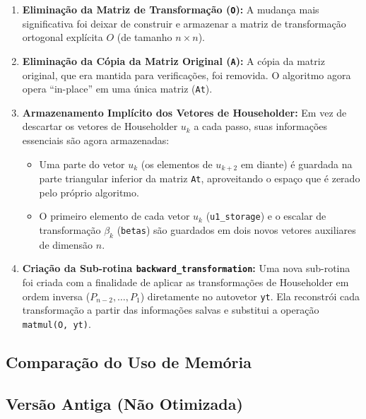 \documentclass[12pt, a4paper]{article} %
\begin{document}
        \begin{enumerate}
            \item \textbf{Elimina\c{c}\~ao da Matriz de Transforma\c{c}\~ao (\texttt{O}):} A mudan\c{c}a mais significativa foi deixar de construir e armazenar a matriz de transforma\c{c}\~ao ortogonal expl\'icita $O$ (de tamanho $n \times n$).

            \item \textbf{Elimina\c{c}\~ao da C\'opia da Matriz Original (\texttt{A}):} A c\'opia da matriz original, que era mantida para verifica\c{c}\~oes, foi removida. O algoritmo agora opera ``in-place'' em uma \'unica matriz (\texttt{At}).

            \item \textbf{Armazenamento Impl\'icito dos Vetores de Householder:} Em vez de descartar os vetores de Householder $u_k$ a cada passo, suas informa\c{c}\~oes essenciais s\~ao agora armazenadas:
            \begin{itemize}
                \item Uma parte do vetor $u_k$ (os elementos de $u_{k+2}$ em diante) \'e guardada na parte triangular inferior da matriz \texttt{At}, aproveitando o espa\c{c}o que \'e zerado pelo pr\'oprio algoritmo.
                \item O primeiro elemento de cada vetor $u_k$ (\texttt{u1\_storage}) e o escalar de transforma\c{c}\~ao $\beta_k$ (\texttt{betas}) s\~ao guardados em dois novos vetores auxiliares de dimens\~ao $n$.
            \end{itemize}

            \item \textbf{Cria\c{c}\~ao da Sub-rotina \texttt{backward\_transformation}:} Uma nova sub-rotina foi criada com a finalidade de aplicar as transforma\c{c}\~oes de Householder em ordem inversa ($P_{n-2}, \dots, P_1$) diretamente no autovetor \texttt{yt}. Ela reconstr\'oi cada transforma\c{c}\~ao a partir das informa\c{c}\~oes salvas e substitui a opera\c{c}\~ao \texttt{matmul(O, yt)}.
        \end{enumerate}

        \subsection*{Compara\c{c}\~ao do Uso de Mem\'oria}

            \subsection*{Vers\~ao Antiga (N\~ao Otimizada)}
\end{document}
